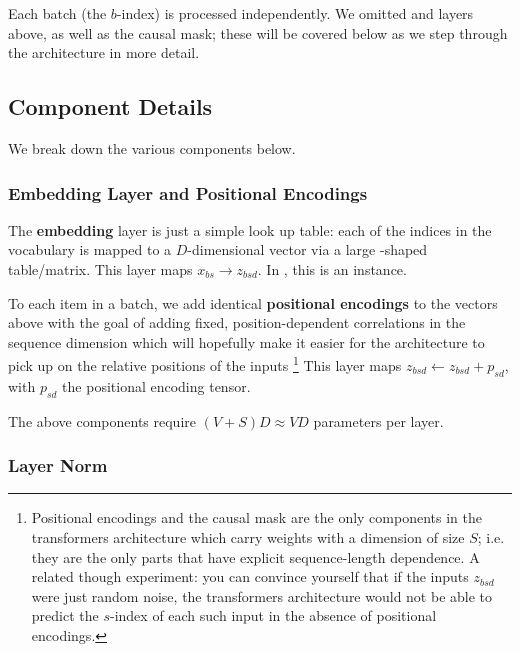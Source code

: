 \documentclass[11pt]{article}
\begin{document}
Each batch (the $ b $-index) is processed independently. We omitted  and
 layers above, as well as the causal mask; these will be covered below as we step
through the architecture in more detail.


\subsection{Component Details \label{subsec:decoder_only_components} }

We break down the various components below.

\subsubsection{Embedding Layer and Positional Encodings \label{subsubsec:embedding_and_pe} }

The \textbf{embedding} layer is just a simple look up table: each of the  indices
in the vocabulary is mapped to a $ D $-dimensional vector via a large -shaped
table/matrix. This layer maps $ x _{ bs } \longrightarrow z _{ bsd } $. In , this is
an  instance.

To each item in a batch, we add identical \textbf{positional encodings} to the vectors above with
the goal of adding fixed, position-dependent correlations in the sequence dimension which will
hopefully make it easier for the architecture to pick up on the relative positions of the inputs
\footnote{Positional encodings and the causal mask are the only components in the transformers
architecture which carry weights with a dimension of size $ S $; i.e. they are the only parts that
have explicit sequence-length dependence. A related though experiment: you can convince yourself
that if the inputs $ z_{ bsd } $
were just random noise, the transformers architecture would not be able to predict
the $ s $-index of each such input in the absence of positional encodings. } This layer maps $ z _{
bsd} \leftarrow z _{ bsd } + p _{ sd } $, with $ p _{ sd } $ the positional encoding tensor.

The above components require $ (V+S)D \approx VD $ parameters per layer.



\subsubsection{Layer Norm \label{subsubsec:layer_norm} }
\end{document}
